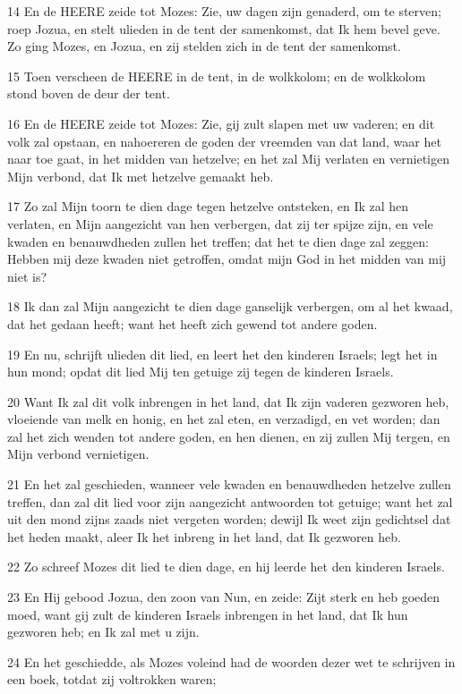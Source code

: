 \par 14 En de HEERE zeide tot Mozes: Zie, uw dagen zijn genaderd, om te sterven; roep Jozua, en stelt ulieden in de tent der samenkomst, dat Ik hem bevel geve. Zo ging Mozes, en Jozua, en zij stelden zich in de tent der samenkomst.
\par 15 Toen verscheen de HEERE in de tent, in de wolkkolom; en de wolkkolom stond boven de deur der tent.
\par 16 En de HEERE zeide tot Mozes: Zie, gij zult slapen met uw vaderen; en dit volk zal opstaan, en nahoereren de goden der vreemden van dat land, waar het naar toe gaat, in het midden van hetzelve; en het zal Mij verlaten en vernietigen Mijn verbond, dat Ik met hetzelve gemaakt heb.
\par 17 Zo zal Mijn toorn te dien dage tegen hetzelve ontsteken, en Ik zal hen verlaten, en Mijn aangezicht van hen verbergen, dat zij ter spijze zijn, en vele kwaden en benauwdheden zullen het treffen; dat het te dien dage zal zeggen: Hebben mij deze kwaden niet getroffen, omdat mijn God in het midden van mij niet is?
\par 18 Ik dan zal Mijn aangezicht te dien dage ganselijk verbergen, om al het kwaad, dat het gedaan heeft; want het heeft zich gewend tot andere goden.
\par 19 En nu, schrijft ulieden dit lied, en leert het den kinderen Israels; legt het in hun mond; opdat dit lied Mij ten getuige zij tegen de kinderen Israels.
\par 20 Want Ik zal dit volk inbrengen in het land, dat Ik zijn vaderen gezworen heb, vloeiende van melk en honig, en het zal eten, en verzadigd, en vet worden; dan zal het zich wenden tot andere goden, en hen dienen, en zij zullen Mij tergen, en Mijn verbond vernietigen.
\par 21 En het zal geschieden, wanneer vele kwaden en benauwdheden hetzelve zullen treffen, dan zal dit lied voor zijn aangezicht antwoorden tot getuige; want het zal uit den mond zijns zaads niet vergeten worden; dewijl Ik weet zijn gedichtsel dat het heden maakt, aleer Ik het inbreng in het land, dat Ik gezworen heb.
\par 22 Zo schreef Mozes dit lied te dien dage, en hij leerde het den kinderen Israels.
\par 23 En Hij gebood Jozua, den zoon van Nun, en zeide: Zijt sterk en heb goeden moed, want gij zult de kinderen Israels inbrengen in het land, dat Ik hun gezworen heb; en Ik zal met u zijn.
\par 24 En het geschiedde, als Mozes voleind had de woorden dezer wet te schrijven in een boek, totdat zij voltrokken waren;
